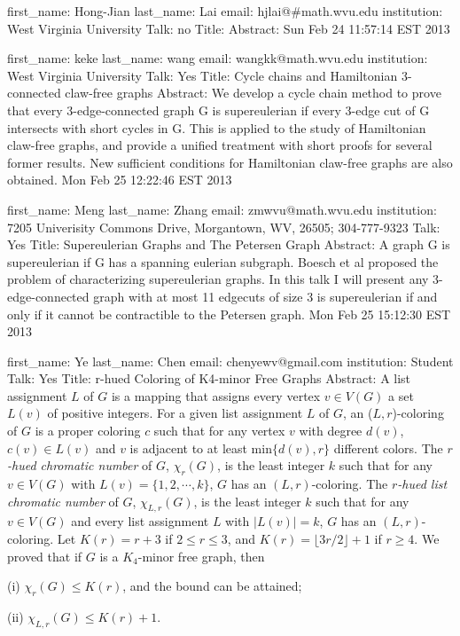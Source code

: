 \documentclass{article}
\begin{document}
first_name: Hong-Jian
last_name: Lai
email: hjlai@#math.wvu.edu
institution: West Virginia University
Talk: no
Title:
Abstract:
Sun Feb 24 11:57:14 EST 2013

first_name: keke
last_name: wang
email: wangkk@math.wvu.edu
institution: West Virginia University
Talk: Yes
Title: Cycle chains and Hamiltonian 3-connected claw-free graphs
Abstract: We develop a cycle chain method to prove that every 3-edge-connected graph G is supereulerian if every 3-edge cut of G intersects with short cycles in G. This is applied to the study of Hamiltonian claw-free graphs, and provide a unified treatment with short proofs for several former results. New sufficient conditions for Hamiltonian claw-free graphs are also obtained.
Mon Feb 25 12:22:46 EST 2013

first_name: Meng
last_name: Zhang
email: zmwvu@math.wvu.edu
institution: 7205 Univerisity Commons Drive, Morgantown, WV, 26505; 304-777-9323
Talk: Yes
Title: Supereulerian Graphs and The Petersen Graph
Abstract: A graph G is supereulerian if G has a spanning eulerian subgraph. Boesch et al proposed the problem of characterizing supereulerian graphs. In this talk I will present any 3-edge-connected graph with at most 11 edgecuts of size 3 is supereulerian if and only if it cannot be contractible to the Petersen graph.
Mon Feb 25 15:12:30 EST 2013

first_name: Ye
last_name: Chen
email: chenyewv@gmail.com
institution: Student
Talk: Yes
Title: r-hued Coloring of K4-minor Free Graphs
Abstract: A list assignment $L$ of $G$ is a mapping that assigns every vertex $v\in V(G)$ a set $L(v)$ of positive integers. For a given list assignment $L$ of $G$, an ($L,r$)-coloring of $G$ is a proper coloring $c$ such that for any vertex $v$ with degree $d(v)$, $c(v)\in L(v)$ and $v$ is adjacent to at least min$\{d(v),r\}$ different colors. The {\it $r$-hued chromatic number} of $G$, $\chi_{r}(G)$, is the least integer $k$ such that for any $v \in V(G)$ with $L(v) = \{1,2,\cdots,k\}$, $G$ has an $(L,r)$-coloring. The {\it $r$-hued list chromatic number} of $G$, $\chi_{L,r}(G)$, is the least integer $k$ such that for any $v \in V(G)$ and every list assignment $L$ with $|L(v)| = k$, $G$ has an $(L,r)$-coloring. Let $K(r)=r+3$ if $2 \le r \le 3$, and  $K(r)=\lfloor 3r/2\rfloor+1$ if $r\ge 4$. We proved that if $G$ is a $K_4$-minor free graph, then

(i) $\chi_r(G) \le K(r)$, and the bound can be attained;

(ii) $\chi_{L,r}(G) \le K(r)+1$.
\end{document}
